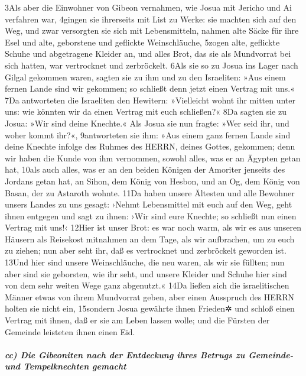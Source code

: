 3Als aber die Einwohner von Gibeon vernahmen, wie Josua mit Jericho und
Ai verfahren war, 4gingen sie ihrerseits mit List zu Werke: sie machten
sich auf den Weg, und zwar versorgten sie sich mit Lebensmitteln, nahmen
alte Säcke für ihre Esel und alte, geborstene und geflickte
Weinschläuche, 5zogen alte, geflickte Schuhe und abgetragene Kleider an,
und alles Brot, das sie als Mundvorrat bei sich hatten, war vertrocknet
und zerbröckelt. 6Als sie so zu Josua ins Lager nach Gilgal gekommen
waren, sagten sie zu ihm und zu den Israeliten: »Aus einem fernen Lande
sind wir gekommen; so schließt denn jetzt einen Vertrag mit uns.« 7Da
antworteten die Israeliten den Hewitern: »Vielleicht wohnt ihr mitten
unter uns: wie könnten wir da einen Vertrag mit euch schließen?« 8Da
sagten sie zu Josua: »Wir sind deine Knechte.« Als Josua sie nun fragte:
»Wer seid ihr, und woher kommt ihr?«, 9antworteten sie ihm: »Aus einem
ganz fernen Lande sind deine Knechte infolge des Ruhmes des HERRN,
deines Gottes, gekommen; denn wir haben die Kunde von ihm vernommen,
sowohl alles, was er an Ägypten getan hat, 10als auch alles, was er an
den beiden Königen der Amoriter jenseits des Jordans getan hat, an
Sihon, dem König von Hesbon, und an Og, dem König von Basan, der zu
Astaroth wohnte. 11Da haben unsere Ältesten und alle Bewohner unsers
Landes zu uns gesagt: ›Nehmt Lebensmittel mit euch auf den Weg, geht
ihnen entgegen und sagt zu ihnen: ›Wir sind eure Knechte; so schließt
nun einen Vertrag mit uns!‹ 12Hier ist unser Brot: es war noch warm, als
wir es aus unseren Häusern als Reisekost mitnahmen an dem Tage, als wir
aufbrachen, um zu euch zu ziehen; nun aber seht ihr, daß es vertrocknet
und zerbröckelt geworden ist. 13Und hier sind unsere Weinschläuche, die
neu waren, als wir sie füllten; nun aber sind sie geborsten, wie ihr
seht, und unsere Kleider und Schuhe hier sind von dem sehr weiten Wege
ganz abgenutzt.« 14Da ließen sich die israelitischen Männer etwas von
ihrem Mundvorrat geben, aber einen Ausspruch des HERRN holten sie nicht
ein, 15sondern Josua gewährte ihnen Frieden✲ und schloß einen Vertrag
mit ihnen, daß er sie am Leben lassen wolle; und die Fürsten der
Gemeinde leisteten ihnen einen Eid.

\hypertarget{cc-die-gibeoniten-nach-der-entdeckung-ihres-betrugs-zu-gemeinde--und-tempelknechten-gemacht}{%
\subparagraph{cc) Die Gibeoniten nach der Entdeckung ihres Betrugs zu
Gemeinde- und Tempelknechten
gemacht}\label{cc-die-gibeoniten-nach-der-entdeckung-ihres-betrugs-zu-gemeinde--und-tempelknechten-gemacht}}

